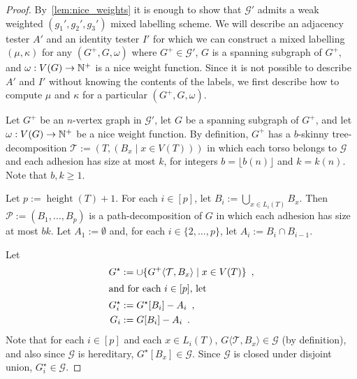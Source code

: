 \documentclass{patmorin}
\renewcommand{\geq}{\geqslant}
\newcommand{\torso}[2]{{#1}\langle{#2}\rangle}
\DeclareMathOperator{\height}{height}
\DeclarePairedDelimiter{\set}{\{}{\}}
\newcommand{\calG}{\mathcal{G}}
\newcommand{\calP}{\mathcal{P}}
\newcommand{\calT}{\mathcal{T}}
\begin{document}
\begin{proof}
  By~\cref{lem:nice_weights} it is enough to show that $\calG'$ admits a weak weighted $(g_1',g_2',g_3')$ mixed labelling scheme. We will describe an adjacency tester $A'$ and an identity tester $I'$ for which we can construct a mixed labelling $(\mu,\kappa)$ for any $(G^+,G,\omega)$ where $G^+\in\calG'$, $G$ is a spanning subgraph of $G^+$, and $\omega:V(G)\to\mathbb{N}^+$ is a nice weight function.
  Since it is not possible to describe $A'$ and $I'$ without knowing the contents of the labels, we first describe how to compute $\mu$ and $\kappa$ for a particular $(G^+,G,\omega)$.

  Let $G^+$ be an $n$-vertex graph in $\calG'$, let $G$ be a spanning subgraph of $G^+$, and let $\omega:V(G)\to\mathbb{N}^+$ be a nice weight function.  By definition, $G^+$ has a $b$-skinny tree-decomposition $\calT:=(T,(B_x\mid x\in V(T)))$ in which each torso belongs to $\calG$ and each adhesion has size at most $k$, for integers $b =\lfloor b(n)\rfloor$ and $k = k(n)$. Note that $b,k\geq1$.

  Let $p:=\height(T)+1$.
  For each $i\in[p]$, let $B_i:=\bigcup_{x\in L_i(T)} B_x$.  Then $\calP:=(B_1,\ldots,B_p)$ is a path-decomposition of $G$ in which each adhesion has size at most $bk$.
  Let $A_1:=\emptyset$ and, for each $i\in\{2,\ldots,p\}$, let $A_i:=B_i\cap B_{i-1}$.

  Let
  \begin{align*}
    G^\star
     & := \cup\set{\torso{G^+}{\calT,B_x}\mid x\in V(T)}\enspace, \\
    \intertext{and for each $i\in[p]$, let }
    G^\star_i
     & := G^\star[B_i]-A_i\enspace,                                     \\
    G_i
     & := G[B_i]-A_i\enspace.
  \end{align*}
  Note that for each $i\in[p]$ and each $x\in L_i(T)$, $\torso{G}{\calT,B_x}\in\calG$
  (by definition), and also since $\calG$ is hereditary, $G^\star[B_x]\in\calG$.  Since $\calG$ is closed under disjoint union, $G^\star_i\in\calG$.


\end{proof}
\end{document}
